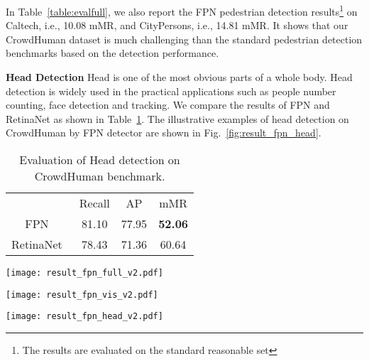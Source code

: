\documentclass[10pt,twocolumn,letterpaper]{article}
\newcommand{\myparagraph}[1]{{\vspace{0.5em} \noindent \bf #1}}
\begin{document}
In Table~\ref{table:evalfull}, we also report the FPN pedestrian detection results\footnote{The results are evaluated on the standard reasonable set} on Caltech, i.e., 10.08 mMR, and CityPersons, i.e., 14.81 mMR. It shows that our CrowdHuman dataset is much challenging than the standard pedestrian detection benchmarks based on the detection performance.


\myparagraph{Head Detection} Head is one of the most obvious parts of a whole body. Head detection is widely used in the practical applications such as people number counting, face detection and tracking. We compare the results of FPN and RetinaNet as shown in Table~\ref{table:evalHead}. The illustrative examples of head detection on CrowdHuman by FPN detector are shown in Fig.~\ref{fig:result_fpn_head}.


\setlength{\tabcolsep}{4pt}
\begin{table}
\begin{center}
\caption{Evaluation of Head detection on CrowdHuman benchmark.}
\label{table:evalHead}
\begin{tabular}{cccc}
\hline\noalign{\smallskip}
{} & Recall & AP & mMR\\
\noalign{\smallskip}
\hline
\noalign{\smallskip}
FPN~\cite{lin2017feature}  & {81.10} & {77.95} & {\textbf{52.06}}\\
RetinaNet~\cite{lin2017focal} & {78.43} & {71.36} & {60.64}\\
\hline
\end{tabular}
\end{center}
\end{table}
\setlength{\tabcolsep}{1.4pt}


\begin{figure*}
\centering
\texttt{[image: result\_fpn\_full\_v2.pdf]}
\caption{Qualitative results for the full body detection of FPN based on CrowdHuman dataset.}
\label{fig:result_fpn_full}
\end{figure*}

\begin{figure*}
\centering
\texttt{[image: result\_fpn\_vis\_v2.pdf]}
\caption{Qualitative results for the visible body detection of FPN based on CrowdHuman dataset.}
\label{fig:result_fpn_vis}
\end{figure*}

\begin{figure*}
\centering
\texttt{[image: result\_fpn\_head\_v2.pdf]}
\caption{Qualitative results for the head detection of FPN based on CrowdHuman dataset.}
\label{fig:result_fpn_head}
\end{figure*}
\end{document}

